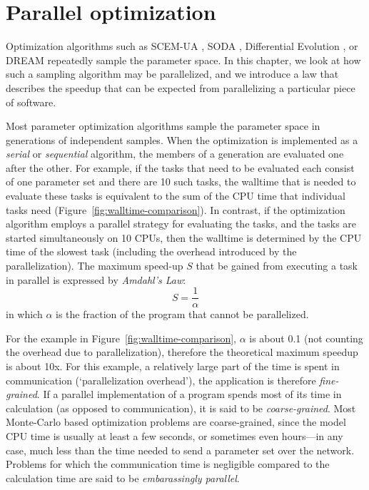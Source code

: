 \chapter{Parallel optimization}


Optimization algorithms such as SCEM-UA \citep{vrug-gupt-bout-soro-2003}, SODA \citep{vrug-diks-gupt-bout-vers-2005}, Differential Evolution \citep{stor-pric-1997}, or DREAM \citep{vrug-terb-diks-robi-hyma-higd-2009} repeatedly sample the parameter space. In this chapter, we look at how such a sampling algorithm may be parallelized, and we introduce a law that describes the speedup that can be expected from parallelizing a particular piece of software.

Most parameter optimization algorithms sample the parameter space in generations of independent samples. When the optimization is implemented as a \textit{serial } or \textit{sequential} algorithm, the members of a generation are evaluated one after the other. For example, if the tasks that need to be evaluated each consist of one parameter set and there are 10 such tasks, the walltime that is needed to evaluate these tasks is equivalent to the sum of the CPU time that individual tasks need (Figure~\ref{fig:walltime-comparison}). In contrast, if the optimization algorithm employs a parallel strategy for evaluating the tasks, and the tasks are started simultaneously on 10 CPUs, then the walltime is determined by the CPU time of the slowest task (including the overhead introduced by the parallelization). The maximum speed-up $S$ that be gained from executing a task in parallel is expressed by \textit{Amdahl's Law}:
\begin{equation}
S=\frac{1}{\alpha}
\label{eq:amdahls-law}
\end{equation}
in which $\alpha$ is the fraction of the program that cannot be parallelized.

For the example in Figure~\ref{fig:walltime-comparison}, $\alpha$ is about 0.1 (not counting the overhead due to parallelization), therefore the theoretical maximum speedup is about 10x. For this example, a relatively large part of the time is spent in communication (`parallelization overhead'), the application is therefore \textit{fine-grained}. If a parallel implementation of a program spends most of its time in calculation (as opposed to communication), it is said to be \textit{coarse-grained}. Most Monte-Carlo based optimization problems are coarse-grained, since the model CPU time is usually at least a few seconds, or sometimes even hours---in any case, much less than the time needed to send a parameter set over the network. Problems for which the communication time is negligible compared to the calculation time are said to be \textit{embarassingly parallel}.





